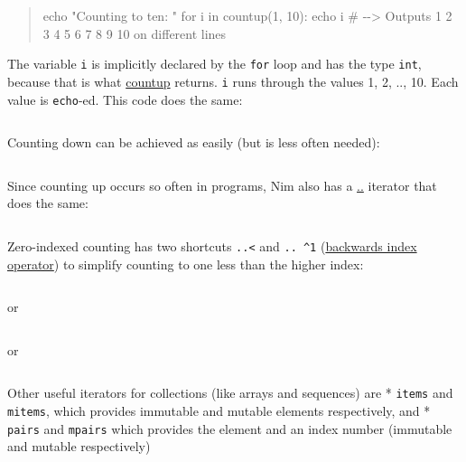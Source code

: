 \begin{quote}
echo "Counting to ten: " for i in countup(1, 10): echo i \#
-\/-\textgreater{} Outputs 1 2 3 4 5 6 7 8 9 10 on different lines
\end{quote}

The variable \texttt{i} is implicitly declared by the \texttt{for} loop
and has the type \texttt{int}, because that is what
\href{system.html\#countup.i,T,T,Positive}{countup} returns. \texttt{i}
runs through the values 1, 2, .., 10. Each value is \texttt{echo}-ed.
This code does the same:

\begin{verbatim}
\end{verbatim}

Counting down can be achieved as easily (but is less often needed):

\begin{verbatim}
\end{verbatim}

Since counting up occurs so often in programs, Nim also has a
\href{system.html\#...i,T,T}{..} iterator that does the same:

\begin{verbatim}
\end{verbatim}

Zero-indexed counting has two shortcuts \texttt{..\textless{}} and
\texttt{..\ \^{}1} (\href{system.html\#\%5E.t\%2Cint}{backwards index
operator}) to simplify counting to one less than the higher index:

\begin{verbatim}
\end{verbatim}

or

\begin{verbatim}
\end{verbatim}

or

\begin{verbatim}
\end{verbatim}

Other useful iterators for collections (like arrays and sequences) are *
\texttt{items} and \texttt{mitems}, which provides immutable and mutable
elements respectively, and * \texttt{pairs} and \texttt{mpairs} which
provides the element and an index number (immutable and mutable
respectively)

\begin{verbatim}
\end{verbatim}

